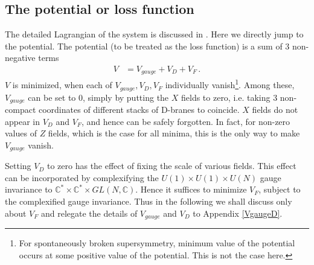 \documentclass[12pt,a4paper]{JHEP3}
\begin{document}
\subsection{The potential or loss function}
The detailed Lagrangian of the system is discussed in \cite{Chowdhury:2014yca, Chowdhury:2015gbk}. Here we directly jump to the potential. The potential (to be treated as the loss function) is a sum of 3 non-negative terms 
\begin{align}
V &= V_{gauge} +V_D + V_F \, .
\end{align}
$V$ is minimized, when each of $V_{gauge} ,V_D , V_F$ individually vanish\footnote{For spontaneously broken supersymmetry, minimum value of the potential occurs at some positive value of the potential. This is not the case here.}.
Among  these, $V_{gauge}$ can be set to 0, simply by putting the $X$ fields to zero, i.e. taking  3 non-compact coordinates of different stacks of D-branes to coincide. $X$ fields do not appear in $V_D$ and $V_F $, and hence can be safely forgotten. In fact, for non-zero values of $Z$ fields, which is the case for all minima, this is the only way to make $V_{gauge}$ vanish.

Setting $V_D$ to zero has the effect of fixing the scale of various fields. This effect can be incorporated by complexifying the $U(1) \times U(1) \times U(N)$ gauge invariance to $\mathbb{C}^* \times \mathbb{C}^* \times GL(N, \mathbb{C})$. Hence  it suffices to minimize $V_F$, subject  to the complexified gauge invariance. Thus in the following we shall discuss only about $V_F$ and relegate the details of $V_{gauge}$ and $V_D$ to Appendix \ref{VgaugeD}. 
\end{document}
